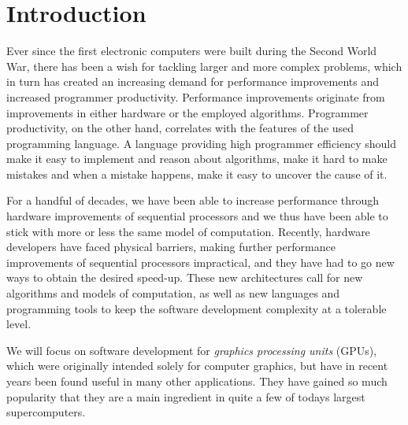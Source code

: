
\chapter{Introduction}
Ever since the first electronic computers were built during the Second
World War, there has been a wish for tackling larger and more complex
problems, which in turn has created an increasing demand for
performance improvements and increased programmer
productivity. Performance improvements originate from improvements in
either hardware or the employed algorithms. Programmer productivity,
on the other hand, correlates with the features of the used
programming language. A language providing high programmer efficiency
should make it easy to implement and reason about algorithms, make it
hard to make mistakes and when a mistake happens, make it easy to
uncover the cause of it. 

For a handful of decades, we have been able to increase performance
through hardware improvements of sequential processors and we thus
have been able to stick with more or less the same model of
computation. Recently, hardware developers have faced physical
barriers, making further performance improvements of sequential
processors impractical, and they have had to go new ways to obtain the
desired speed-up. These new architectures call for new algorithms and
models of computation, as well as new languages and programming tools
to keep the software development complexity at a tolerable level.

We will focus on software development for \textit{graphics processing
 units} (GPUs), which were originally intended solely for computer
graphics, but have in recent years been found useful in many other
applications. They have gained so much popularity that they are a main
ingredient in quite a few of todays largest
supercomputers. 

